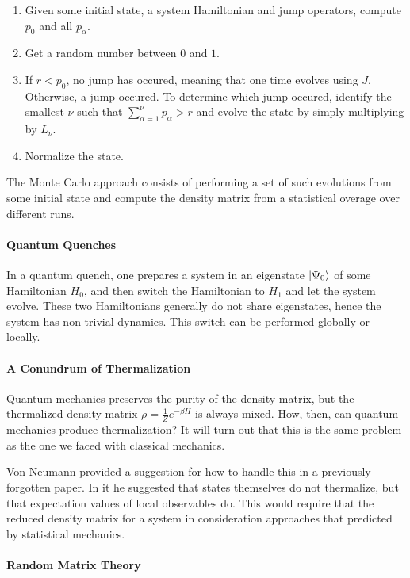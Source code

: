 \begin{enumerate}
	\item Given some initial state, a system Hamiltonian and jump operators, compute $p_{0}$ and all $p_{\alpha}$.
	\item Get a random number between $0$ and $1$.
	\item If $r < p_{0}$, no jump has occured, meaning that one time evolves using $J$. Otherwise, a jump occured. To determine which jump occured, identify the smallest $\nu$ such that $\sum\limits_{\alpha = 1}^{\nu}p_{\alpha}  > r$ and evolve the state by simply multiplying by $L_{\nu}$.
	\item Normalize the state.
\end{enumerate}
The Monte Carlo approach consists of performing a set of such evolutions from some initial state and compute the density matrix from a statistical overage over different runs.

\paragraph{Quantum Quenches}
In a quantum quench, one prepares a system in an eigenstate $\ket{\Psi_{0}}$ of some Hamiltonian $H_{0}$, and then switch the Hamiltonian to $H_{1}$ and let the system evolve. These two Hamiltonians generally do not share eigenstates, hence the system has non-trivial dynamics. This switch can be performed globally or locally.

\paragraph{A Conundrum of Thermalization}
Quantum mechanics preserves the purity of the density matrix, but the thermalized density matrix $\rho = \frac{1}{Z}e^{-\beta H}$ is always mixed. How, then, can quantum mechanics produce thermalization? It will turn out that this is the same problem as the one we faced with classical mechanics.

Von Neumann provided a suggestion for how to handle this in a previously-forgotten paper. In it he suggested that states themselves do not thermalize, but that expectation values of local observables do. This would require that the reduced density matrix for a system in consideration approaches that predicted by statistical mechanics.

\paragraph{Random Matrix Theory}
